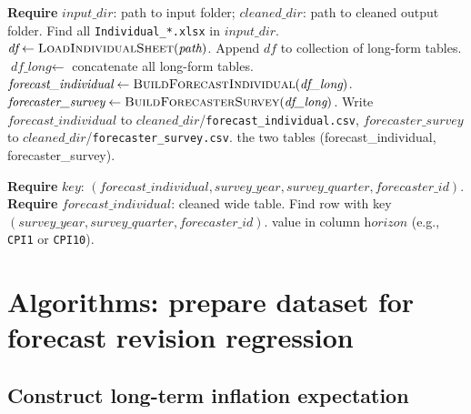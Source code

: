 \documentclass[11pt]{article}
\begin{document}
\begin{algorithm}[H]
\caption{\textsc{CleanIndividualTo3NF}$(\textit{input\_dir}, \textit{cleaned\_dir})$}
\begin{algorithmic}[1]
\State \textbf{Require} $\textit{input\_dir}$: path to input folder; $\textit{cleaned\_dir}$: path to cleaned output folder.
\State Find all \texttt{Individual\_*.xlsx} in $\textit{input\_dir}$.
    \State $\textit{df} \gets \textsc{LoadIndividualSheet}(\textit{path})$.
    \State Append $\textit{df}$ to collection of long-form tables.
\EndFor
\State $\textit{df\_long} \gets$ concatenate all long-form tables.
\State $\textit{forecast\_individual} \gets \textsc{BuildForecastIndividual}(\textit{df\_long})$.
\State $\textit{forecaster\_survey} \gets \textsc{BuildForecasterSurvey}(\textit{df\_long})$.
\State Write $\textit{forecast\_individual}$ to $\textit{cleaned\_dir}$/\texttt{forecast\_individual.csv}, $\textit{forecaster\_survey}$ to $\textit{cleaned\_dir}$/\texttt{forecaster\_survey.csv}.
\State \Return the two tables (forecast\_individual, forecaster\_survey).
\end{algorithmic}
\end{algorithm}

\begin{algorithm}[H]
\caption{\textsc{GetQuarterSpecificValue}$(\textit{key}, \textit{horizon})$}
\begin{algorithmic}[1]
\State \textbf{Require} $\textit{key}$:
\Statex \quad $(\textit{forecast\_individual}, \textit{survey\_year}, \textit{survey\_quarter}, \textit{forecaster\_id})$.
\State \textbf{Require} $\textit{forecast\_individual}$: cleaned wide table.
\State Find row with key
\Statex \quad $(\textit{survey\_year}, \textit{survey\_quarter}, \textit{forecaster\_id})$.
\State \Return value in column $\textit{horizon}$ (e.g., \texttt{CPI1} or \texttt{CPI10}).
\end{algorithmic}
\end{algorithm}

\section{Algorithms: prepare dataset for forecast revision regression}

\subsection{Construct long-term inflation expectation}
\end{document}
